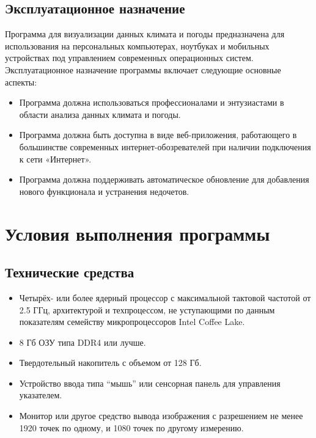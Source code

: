 \documentclass[a4paper, 12pt]{article}
\begin{document}
	\subsection{Эксплуатационное назначение}
	Программа для визуализации данных климата и погоды предназначена для использования на персональных компьютерах,
	ноутбуках и мобильных устройствах под управлением современных операционных систем. Эксплуатационное назначение программы
	включает следующие основные аспекты:
	\begin{itemize}
		\item Программа должна использоваться профессионалами и энтузиастами в области анализа данных климата и погоды.

		\item Программа должна быть доступна в виде веб-приложения, работающего в большинстве современных интернет-обозревателей
			при наличии подключения к сети «Интернет».

		\item Программа должна поддерживать автоматическое обновление для добавления нового функционала и устранения недочетов.
	\end{itemize}

	\section{Условия выполнения программы}\label{section:2}
	\subsection{Технические средства}\label{section:2.1}
	\begin{itemize}
		\item Четырёх- или более ядерный процессор с максимальной тактовой частотой от 2.5 ГГц, архитектурой и техпроцессом,
			не уступающими по данным показателям семейству микропроцессоров Intel Coffee Lake.

		\item 8 Гб ОЗУ типа DDR4 или лучше.

		\item Твердотельный накопитель с объемом от 128 Гб.

		\item Устройство ввода типа \enquote{мышь} или сенсорная панель для управления указателем.

		\item Монитор или другое средство вывода изображения с разрешением не менее 1920 точек по одному, и 1080 точек по
			другому измерению.
	\end{itemize}
\end{document}
